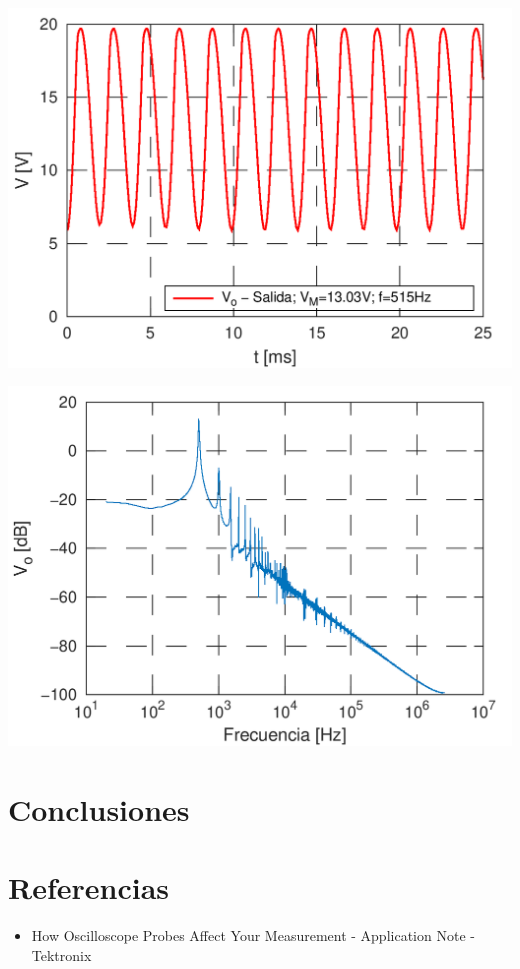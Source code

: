 \begin{multicols}{2}
        \begin{center}
                   \includegraphics[width=\columnwidth]{salida_oscilador.png}
                   \label{fig:sim_out_oscilador}
        \end{center}

        \begin{center}
                   \includegraphics[width=\columnwidth]{fft_oscilador.png}
                   \label{fig:fft}
        \end{center}

        \section{Conclusiones}

        \section{Referencias} %
        \begin{itemize}
            \item How Oscilloscope Probes Affect Your Measurement - Application Note - Tektronix
        \end{itemize}

    \end{multicols}


